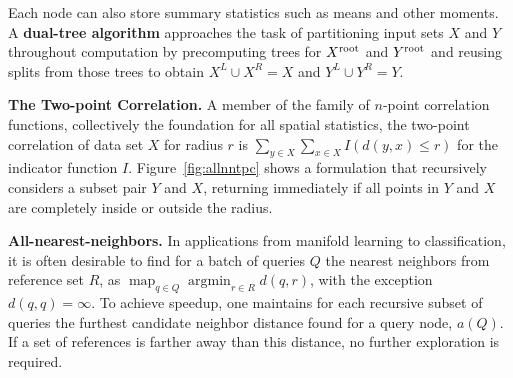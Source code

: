 \documentclass{article}
\DeclareMathOperator*{\argmin}{argmin}
\DeclareMathOperator*{\map}{map}
\newcommand{\fig}[1]{Figure~\ref{fig:#1}}
\newcommand{\spos}{^{{\scriptscriptstyle +\!}}}
\newcommand{\sneg}{^{{\scriptscriptstyle -\!}}}
\newcommand{\kdroot}[1]{#1^{\text{\rm root}}}
\newcommand{\kdleft}[1]{#1^{\!L}}
\newcommand{\kdright}[1]{#1^{\!R}}
\begin{document}
Each node can also store summary statistics such as means and other moments.
A {\bf dual-tree algorithm} approaches the task of partitioning
input sets $X$ and $Y$ throughout computation by precomputing trees
for $\kdroot{X}$ and $\kdroot{Y}$ and reusing splits from those
trees to obtain $\kdleft{X} \cup \kdright{X} = X$ and $\kdleft{Y}
\cup \kdright{Y} = Y$.

{\bf The Two-point Correlation.} A member of the family of $n$-point correlation functions, collectively the foundation for all spatial statistics, the two-point correlation of data set $X$ for radius $r$ is
$\sum_{y \in X} \sum_{x \in X} I(d(y, x) \leq r)$ for the indicator function $I$.
\fig{allnntpc} shows a formulation that recursively considers a subset pair $Y$ and $X$, returning immediately if all points in $Y$ and $X$ are completely inside or outside the radius.

{\bf All-nearest-neighbors.} In applications from manifold learning to classification, it is often desirable to find for a batch of queries $Q$ the nearest neighbors from reference set $R$, as $\map_{q \in Q} \argmin_{r \in R} d(q,r)$, with the exception $d(q,q) = \infty$.
To achieve speedup, one maintains for each recursive subset of queries the furthest candidate neighbor distance found for a query node, $a(Q)$.
If a set of references is farther away than this distance, no further exploration is required.

\end{document}

